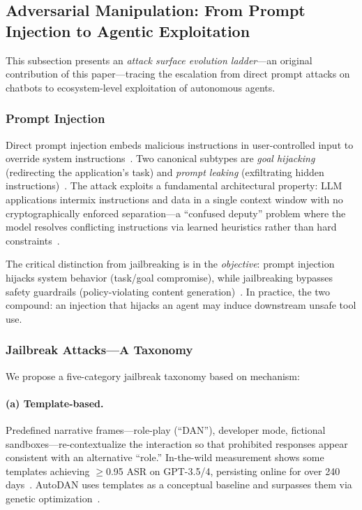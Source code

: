 \subsection{Adversarial Manipulation: From Prompt Injection to Agentic Exploitation}
\label{sec:threat-adversarial}


This subsection presents an \emph{attack surface evolution ladder}---an original contribution of this paper---tracing the escalation from direct prompt attacks on chatbots to ecosystem-level exploitation of autonomous agents.

\subsubsection{Prompt Injection}
\label{sec:threat-pi}

Direct prompt injection embeds malicious instructions in user-controlled input to override system instructions~\cite{perez2022ignore}. Two canonical subtypes are \emph{goal hijacking} (redirecting the application's task) and \emph{prompt leaking} (exfiltrating hidden instructions)~\cite{perez2022ignore}. The attack exploits a fundamental architectural property: LLM applications intermix instructions and data in a single context window with no cryptographically enforced separation---a ``confused deputy'' problem where the model resolves conflicting instructions via learned heuristics rather than hard constraints~\cite{greshake2023ipi}.

The critical distinction from jailbreaking is in the \emph{objective}: prompt injection hijacks system behavior (task/goal compromise), while jailbreaking bypasses safety guardrails (policy-violating content generation)~\cite{perez2022ignore,chao2024jailbreakbench}. In practice, the two compound: an injection that hijacks an agent may induce downstream unsafe tool use.


\subsubsection{Jailbreak Attacks---A Taxonomy}
\label{sec:threat-jailbreak}

We propose a five-category jailbreak taxonomy based on mechanism:

\paragraph{(a) Template-based.}
Predefined narrative frames---role-play (``DAN''), developer mode, fictional sandboxes---re-contextualize the interaction so that prohibited responses appear consistent with an alternative ``role.'' In-the-wild measurement shows some templates achieving $\geq$0.95 ASR on GPT-3.5/4, persisting online for over 240 days~\cite{zhang2024dananything}. AutoDAN uses templates as a conceptual baseline and surpasses them via genetic optimization~\cite{liu2024autodan}.

